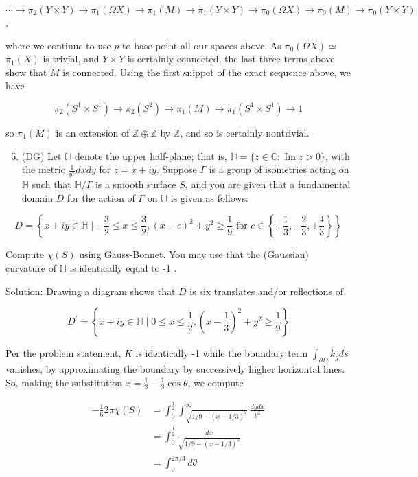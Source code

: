 \documentclass[10pt]{article}
\begin{document}
$\cdots \rightarrow \pi_{2}(Y \times Y) \rightarrow \pi_{1}(\Omega X) \rightarrow \pi_{1}(M) \rightarrow \pi_{1}(Y \times Y) \rightarrow \pi_{0}(\Omega X) \rightarrow \pi_{0}(M) \rightarrow \pi_{0}(Y \times Y)$,

where we continue to use $p$ to base-point all our spaces above. As $\pi_{0}(\Omega X) \simeq$ $\pi_{1}(X)$ is trivial, and $Y \times Y$ is certainly connected, the last three terms above show that $M$ is connected. Using the first snippet of the exact sequence above, we have

$$
\pi_{2}\left(S^{1} \times S^{1}\right) \rightarrow \pi_{2}\left(S^{2}\right) \rightarrow \pi_{1}(M) \rightarrow \pi_{1}\left(S^{1} \times S^{1}\right) \rightarrow 1
$$

so $\pi_{1}(M)$ is an extension of $\mathbb{Z} \oplus \mathbb{Z}$ by $\mathbb{Z}$, and so is certainly nontrivial.

\begin{enumerate}
  \setcounter{enumi}{4}
  \item (DG) Let $\mathbb{H}$ denote the upper half-plane; that is, $\mathbb{H}=\{z \in \mathbb{C}: \operatorname{Im} z>0\}$, with the metric $\frac{1}{y^{2}} d x d y$ for $z=x+i y$. Suppose $\Gamma$ is a group of isometries acting on $\mathbb{H}$ such that $\mathbb{H} / \Gamma$ is a smooth surface $S$, and you are given that a fundamental domain $D$ for the action of $\Gamma$ on $\mathbb{H}$ is given as follows:
\end{enumerate}

$$
D=\left\{x+i y \in \mathbb{H} \mid-\frac{3}{2} \leq x \leq \frac{3}{2},(x-c)^{2}+y^{2} \geq \frac{1}{9} \text { for } c \in\left\{ \pm \frac{1}{3}, \pm \frac{2}{3}, \pm \frac{4}{3}\right\}\right\}
$$

Compute $\chi(S)$ using Gauss-Bonnet. You may use that the (Gaussian) curvature of $\mathbb{H}$ is identically equal to -1 .

Solution: Drawing a diagram shows that $D$ is six translates and/or reflections of

$$
D^{\prime}=\left\{x+i y \in \mathbb{H} \mid 0 \leq x \leq \frac{1}{2},\left(x-\frac{1}{3}\right)^{2}+y^{2} \geq \frac{1}{9}\right\}
$$

Per the problem statement, $K$ is identically -1 while the boundary term $\int_{\partial D} k_{g} d s$ vanishes, by approximating the boundary by successively higher horizontal lines. So, making the substitution $x=\frac{1}{3}-\frac{1}{3} \cos \theta$, we compute

$$
\begin{aligned}
-\frac{1}{6} 2 \pi \chi(S) & =\int_{0}^{\frac{1}{2}} \int_{\sqrt{1 / 9-(x-1 / 3)^{2}}}^{\infty} \frac{d y d x}{y^{2}} \\
& =\int_{0}^{\frac{1}{2}} \frac{d x}{\sqrt{1 / 9-(x-1 / 3)^{2}}} \\
& =\int_{0}^{2 \pi / 3} d \theta
\end{aligned}
$$
\end{document}
